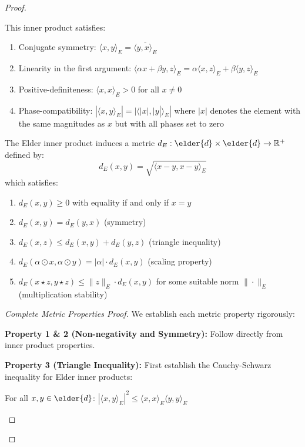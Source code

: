 \begin{proof}
\begin{definition}
This inner product satisfies:
\begin{enumerate}
    \item Conjugate symmetry: $\langle x, y \rangle_E = \overline{\langle y, x \rangle_E}$
    \item Linearity in the first argument: $\langle \alpha x + \beta y, z \rangle_E = \alpha \langle x, z \rangle_E + \beta \langle y, z \rangle_E$
    \item Positive-definiteness: $\langle x, x \rangle_E > 0$ for all $x \neq 0$
    \item Phase-compatibility: $|\langle x, y \rangle_E| = |\langle |x|, |y| \rangle_E|$ where $|x|$ denotes the element with the same magnitudes as $x$ but with all phases set to zero
\end{enumerate}
\end{definition}

\begin{theorem}
The Elder inner product induces a metric $d_E: \elder{d} \times \elder{d} \rightarrow \mathbb{R}^+$ defined by:
\begin{equation}
d_E(x, y) = \sqrt{\langle x - y, x - y \rangle_E}
\end{equation}
which satisfies:
\begin{enumerate}
    \item $d_E(x, y) \geq 0$ with equality if and only if $x = y$
    \item $d_E(x, y) = d_E(y, x)$ (symmetry)
    \item $d_E(x, z) \leq d_E(x, y) + d_E(y, z)$ (triangle inequality)
    \item $d_E(\alpha \odot x, \alpha \odot y) = |\alpha| \cdot d_E(x, y)$ (scaling property)
    \item $d_E(x \star z, y \star z) \leq \|z\|_E \cdot d_E(x, y)$ for some suitable norm $\|\cdot\|_E$ (multiplication stability)
\end{enumerate}
\end{theorem}

\begin{proof}[Complete Metric Properties Proof]
We establish each metric property rigorously:

\textbf{Property 1 \& 2 (Non-negativity and Symmetry):} Follow directly from inner product properties.

\textbf{Property 3 (Triangle Inequality):} 
First establish the Cauchy-Schwarz inequality for Elder inner products:

\begin{lemma}
For all $x, y \in \elder{d}$: $|\langle x, y \rangle_E|^2 \leq \langle x, x \rangle_E \langle y, y \rangle_E$
\end{lemma}


\end{proof}
\end{proof}
